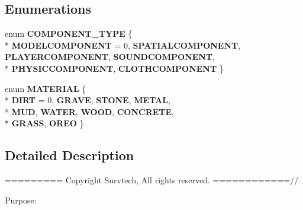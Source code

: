 \subsection*{Enumerations}
\begin{DoxyCompactItemize}
\item 
enum {\bfseries C\+O\+M\+P\+O\+N\+E\+N\+T\+\_\+\+T\+Y\+PE} \{ \\*
{\bfseries M\+O\+D\+E\+L\+C\+O\+M\+P\+O\+N\+E\+NT} = 0, 
{\bfseries S\+P\+A\+T\+I\+A\+L\+C\+O\+M\+P\+O\+N\+E\+NT}, 
{\bfseries P\+L\+A\+Y\+E\+R\+C\+O\+M\+P\+O\+N\+E\+NT}, 
{\bfseries S\+O\+U\+N\+D\+C\+O\+M\+P\+O\+N\+E\+NT}, 
\\*
{\bfseries P\+H\+Y\+S\+I\+C\+C\+O\+M\+P\+O\+N\+E\+NT}, 
{\bfseries C\+L\+O\+T\+H\+C\+O\+M\+P\+O\+N\+E\+NT}
 \}\hypertarget{namespace_component_a601a6b5e042f01a45e69475e59581002}{}\label{namespace_component_a601a6b5e042f01a45e69475e59581002}

\item 
enum {\bfseries M\+A\+T\+E\+R\+I\+AL} \{ \\*
{\bfseries D\+I\+RT} = 0, 
{\bfseries G\+R\+A\+VE}, 
{\bfseries S\+T\+O\+NE}, 
{\bfseries M\+E\+T\+AL}, 
\\*
{\bfseries M\+UD}, 
{\bfseries W\+A\+T\+ER}, 
{\bfseries W\+O\+OD}, 
{\bfseries C\+O\+N\+C\+R\+E\+TE}, 
\\*
{\bfseries G\+R\+A\+SS}, 
{\bfseries O\+R\+EO}
 \}\hypertarget{namespace_component_aae670152e2941d82f1d1613f2ae4e53d}{}\label{namespace_component_aae670152e2941d82f1d1613f2ae4e53d}

\end{DoxyCompactItemize}


\subsection{Detailed Description}
========= Copyright Survtech, All rights reserved. ============//

Purpose\+: 

 